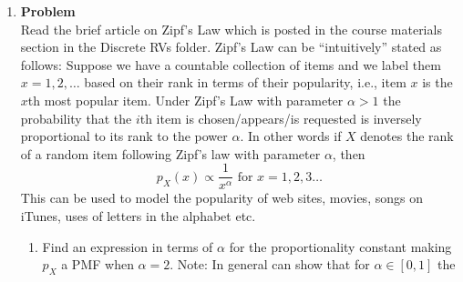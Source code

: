 \documentclass[12pt]{article}
\newenvironment{Ex}{\textbf{Problem}\vspace{.75em}\\}{}
\begin{document}
\begin{enumerate}
\begin{Ex}
\begin{solution}
\begin{enumerate}
          In this case, the quality of service $q$ is the probability
          that the number of active customers $X$ will rise above
          $m=4$, i.e. $P(X>4)$, and signal an overload. Since each
          customer's activity is mutually independent, we can use a
          Binomial Random Variable, $X$ $\sim$ Binomial, to model the
          activity.
          \begin{equation}
            \label{eq:5-p-desc}
            P(X) = {x \choose 10} (0.05)^x(0.95)^{10-x}
          \end{equation}
          Thus, the probability that $X>4$ (overload condition) can be
          modeled by
          \begin{equation}
            \label{eq:5-p-sol}
            \begin{aligned}
              P(X>4) &= \sum_{i=5}^{10} {i \choose 10}
              (0.05)^i(0.95)^{10-i} \\
              &= 0.000063689831 \\
            \end{aligned}
          \end{equation}
        \end{enumerate}
      \end{solution}
    \end{Ex}
  \item
    \begin{Ex}
      Read the brief article on Zipf's Law which is posted in the
      course materials section in the Discrete RVs folder. Zipf's Law
      can be ``intuitively'' stated as follows: Suppose we have a
      countable collection of items and we label them $x = 1,2,
      \ldots$ based on their rank in terms of their popularity, i.e.,
      item $x$ is the $x$th most popular item. Under Zipf's Law with
      parameter $\alpha > 1$ the probability that the $i$th item is
      chosen/appears/is requested is inversely proportional to its
      rank to the power $\alpha$. In other words if $X$ denotes the
      rank of a random item following Zipf's law with parameter
      $\alpha$, then
      $$ p_X(x) \propto \frac{1}{x^\alpha} \text{ for } x = 1, 2, 3
      \ldots $$
      This can be used to model the popularity of web sites, movies,
      songs on iTunes, uses of letters in the alphabet etc.
      \begin{enumerate}
      \item Find an expression in terms of $\alpha$ for the
        proportionality constant making $p_X$ a PMF when $\alpha =
        2$. Note: In general can show that for $\alpha \in [0, 1]$ the

\end{enumerate}
\end{Ex}
\end{enumerate}
\end{document}
